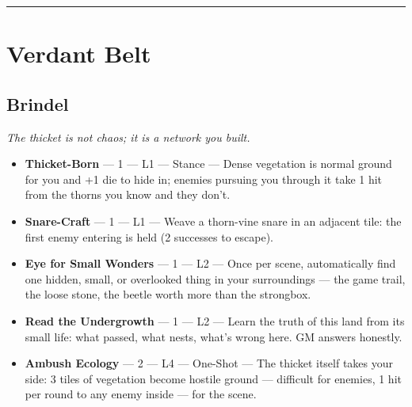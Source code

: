 \medskip\hrule\medskip

\section{Verdant Belt}

\subsection{Brindel}
\textit{The thicket is not chaos; it is a network you built.}
\begin{itemize}
    \item \textbf{Thicket-Born} --- 1 --- L1 --- Stance --- Dense vegetation is normal ground for you and +1 die to hide in; enemies pursuing you through it take 1 hit from the thorns you know and they don't.
    \item \textbf{Snare-Craft} --- 1 --- L1 --- Weave a thorn-vine snare in an adjacent tile: the first enemy entering is held (2 successes to escape).
    \item \textbf{Eye for Small Wonders} --- 1 --- L2 --- Once per scene, automatically find one hidden, small, or overlooked thing in your surroundings --- the game trail, the loose stone, the beetle worth more than the strongbox.
    \item \textbf{Read the Undergrowth} --- 1 --- L2 --- Learn the truth of this land from its small life: what passed, what nests, what's wrong here. GM answers honestly.
    \item \textbf{Ambush Ecology} --- 2 --- L4 --- One-Shot --- The thicket itself takes your side: 3 tiles of vegetation become hostile ground --- difficult for enemies, 1 hit per round to any enemy inside --- for the scene.
\end{itemize}

